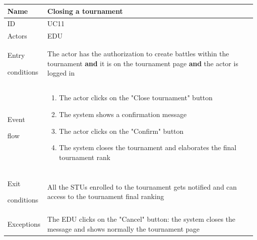\begin{center}
    \def\arraystretch{1.5}
    \begin{tabular}{| m{2cm} | m{10cm}|}
        \hline
        Name                  & Closing a tournament                                                                                                                                  \\ \hline
        ID                    & UC11                                                                                                                                                  \\ \hline
        Actors                & EDU                                                                                                                                                   \\ \hline
        Entry \par conditions & The actor has the authorization to create battles within the tournament \textbf{and} it is on the tournament page \textbf{and} the actor is logged in \\ \hline
        Event \par flow       & \begin{enumerate}
                                    \item The actor clicks on the "Close tournament" button
                                    \item The system shows a confirmation message
                                    \item The actor clicks on the "Confirm" button
                                    \item The system closes the tournament and elaborates the final tournament rank
                                \end{enumerate}                                                                        \\ \hline
        Exit \par conditions  & All the STUs enrolled to the tournament gets notified and can access to the tournament final ranking                                                  \\ \hline
        Exceptions            & The EDU clicks on the "Cancel" button: the system closes the message and shows normally the tournament page                                           \\ \hline
    \end{tabular}
\end{center}


